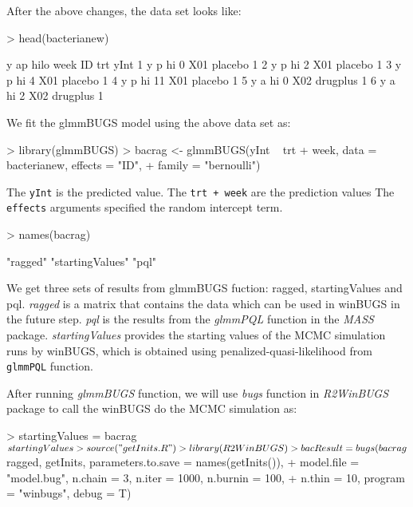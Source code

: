 \documentclass{article}
\begin{document}
After the above changes, the data set looks like: 
\begin{Schunk}
\begin{Sinput}
> head(bacterianew)
\end{Sinput}
\begin{Soutput}
  y ap hilo week  ID      trt yInt
1 y  p   hi    0 X01  placebo    1
2 y  p   hi    2 X01  placebo    1
3 y  p   hi    4 X01  placebo    1
4 y  p   hi   11 X01  placebo    1
5 y  a   hi    0 X02 drugplus    1
6 y  a   hi    2 X02 drugplus    1
\end{Soutput}
\end{Schunk}

We fit the glmmBUGS model using the above data set as: 
\begin{Schunk}
\begin{Sinput}
> library(glmmBUGS)
> bacrag <- glmmBUGS(yInt ~ trt + week, data = bacterianew, effects = "ID", 
+     family = "bernoulli")
\end{Sinput}
\end{Schunk}

The \verb!yInt! is the predicted value. 
The \verb!trt + week! are the prediction values
The \verb!effects! arguments specified the random intercept term.

\begin{Schunk}
\begin{Sinput}
> names(bacrag)
\end{Sinput}
\begin{Soutput}
[1] "ragged"         "startingValues" "pql"           
\end{Soutput}
\end{Schunk}

We get three sets of results from glmmBUGS fuction: ragged, startingValues and pql. 
\textit{ragged} is a matrix that contains the data which can be used in winBUGS in the future step. 
\textit{pql} is the results from the \textit{glmmPQL} function in the \textit{MASS} package.
\textit{startingValues} provides the starting values of the MCMC simulation runs by winBUGS, which is obtained using penalized-quasi-likelihood from \verb!glmmPQL! function.  


After running \textit{glmmBUGS} function, we will use \textit{bugs} function in \textit{R2WinBUGS} package
to call the winBUGS do the MCMC simulation as: 

\begin{Schunk}
\begin{Sinput}
> startingValues = bacrag$startingValues
> source("getInits.R")
> library(R2WinBUGS)
> bacResult = bugs(bacrag$ragged, getInits, parameters.to.save = names(getInits()), 
+     model.file = "model.bug", n.chain = 3, n.iter = 1000, n.burnin = 100, 
+     n.thin = 10, program = "winbugs", debug = T)
\end{Sinput}
\end{Schunk}
\end{document}
